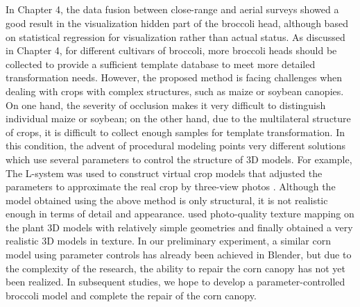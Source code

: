 \subsection{}

In Chapter 4, the data fusion between close-range and aerial surveys showed a good result in the visualization hidden part of the broccoli head, although based on statistical regression for visualization rather than actual status. As discussed in Chapter 4, for different cultivars of broccoli, more broccoli heads should be collected to provide a sufficient template database to meet more detailed transformation needs. However, the proposed method is facing challenges when dealing with crops with complex structures, such as maize or soybean canopies. On one hand, the severity of occlusion makes it very difficult to distinguish individual maize or soybean; on the other hand, due to the multilateral structure of crops, it is difficult to collect enough samples for template transformation. In this condition, the advent of procedural modeling points very different solutions which use several parameters to control the structure of 3D models. For example, The L-system was used to construct virtual crop models that adjusted the parameters to approximate the real crop by three-view photos \citep{cieslak_l-system_2021}. Although the model obtained using the above method is only structural, it is not realistic enough in terms of detail and appearance. \citet{mikami_hidden_2022} used photo-quality texture mapping on the plant 3D models with relatively simple geometries and finally obtained a very realistic 3D models in texture. In our preliminary experiment, a similar corn model using parameter controls has already been achieved in Blender, but due to the complexity of the research, the ability to repair the corn canopy has not yet been realized. In subsequent studies, we hope to develop a parameter-controlled broccoli model and complete the repair of the corn canopy.


